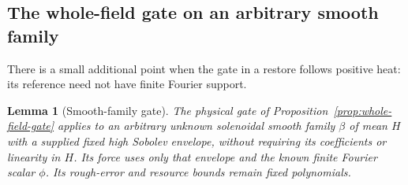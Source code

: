 \documentclass[11pt,a4paper]{amsart}
\newtheorem{lemma}[theorem]{Lemma}
\theoremstyle{definition}
\theoremstyle{remark}
\numberwithin{equation}{section}
\begin{document}
\subsection{The whole-field gate on an arbitrary smooth family}
There is a small additional point when the gate in a restore follows
positive heat: its reference need not have finite Fourier support.

\begin{lemma}[Smooth-family gate]\label{lem:smooth-family-gate}
The physical gate of Proposition~\ref{prop:whole-field-gate} applies to
an arbitrary unknown solenoidal smooth family $\beta$ of mean $H$ with
a supplied fixed high Sobolev envelope, without requiring its coefficients
or linearity in $H$.  Its force uses only that envelope and the known
finite Fourier scalar $\phi$.  Its rough-error and resource bounds remain
fixed polynomials.
\end{lemma}
\end{document}
